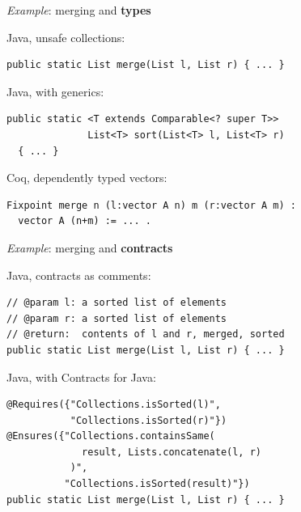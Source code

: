 \documentclass[14pt]{beamer}
\begin{document}
\begin{frame}[fragile]

  {\em Example}: merging and {\bf types}

  \vspace{\baselineskip}

  \pause

  {\small Java, unsafe collections:
  \begin{lstlisting}
public static List merge(List l, List r) { ... }
  \end{lstlisting}}

  \pause

  {\small Java, with generics:
  \begin{lstlisting}
public static <T extends Comparable<? super T>>
              List<T> sort(List<T> l, List<T> r)
  { ... }
  \end{lstlisting}}

  \pause

  {\small Coq, dependently typed vectors:
  \begin{lstlisting}
Fixpoint merge n (l:vector A n) m (r:vector A m) :
  vector A (n+m) := ... .
  \end{lstlisting}}

\end{frame}


\begin{frame}[fragile]

  {\em Example}: merging and {\bf contracts}

  \vspace{\baselineskip}

  \pause

  {\small Java, contracts as comments:
  \begin{lstlisting}
// @param l: a sorted list of elements
// @param r: a sorted list of elements
// @return:  contents of l and r, merged, sorted
public static List merge(List l, List r) { ... }
  \end{lstlisting}}

  \pause

  {\small Java, with Contracts for Java:
  \begin{lstlisting}
@Requires({"Collections.isSorted(l)",
           "Collections.isSorted(r)"})
@Ensures({"Collections.containsSame(
             result, Lists.concatenate(l, r)
           )",
          "Collections.isSorted(result)"})
public static List merge(List l, List r) { ... }
  \end{lstlisting}}

\end{frame}
\end{document}
